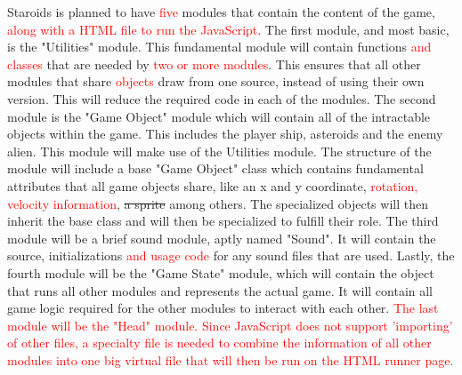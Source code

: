 \documentclass{article}
\begin{document}

Staroids is planned to have \textcolor{red}{five} modules that contain the content of the game, \textcolor{red}{along with a HTML file to run the JavaScript}. The first module, and most basic, is the "Utilities" module. This fundamental module will contain functions \textcolor{red}{and classes} that are needed by \textcolor{red}{two or more modules}. This ensures that all other modules that share \textcolor{red}{objects} draw from one source, instead of using their own version. This will reduce the required code in each of the modules. The second module is the "Game Object" module which will contain all of the intractable objects within the game. This includes the player ship, asteroids and the enemy alien. This module will make use of the Utilities module. The structure of the module will include a base "Game Object" class which contains fundamental attributes that all game objects share, like an x and y coordinate, \textcolor{red}{rotation, velocity information}, \sout{a sprite} among others. The specialized objects will then inherit the base class and will then be specialized to fulfill their role. The third module will be a brief sound module, aptly named "Sound". It will contain the source, initializations \textcolor{red}{and usage code} for any sound files that are used. Lastly, the fourth module will be the "Game State" module, which will contain the object that runs all other modules and represents the actual game. It will contain all game logic required for the other modules to interact with each other. \textcolor{red}{The last module will be the "Head" module. Since JavaScript does not support 'importing' of other files, a specialty file is needed to combine the information of all other modules into one big virtual file that will then be run on the HTML runner page.}\\
\end{document}
